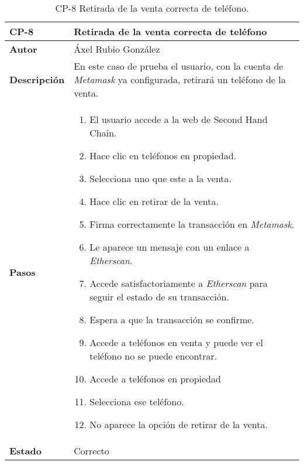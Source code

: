 \begin{table}[p]
	\centering
	\begin{tabularx}{\linewidth}{ p{} p{} }
		\toprule
		\textbf{CP-8}    & \textbf{Retirada de la venta correcta de teléfono}\\
		\toprule
		\textbf{Autor}                & Áxel Rubio González \\
		\textbf{Descripción}          & En este caso de prueba el usuario, con la cuenta de \textit{Metamask} ya configurada, retirará un teléfono de la venta. \\
		\textbf{Pasos}             &
		\begin{enumerate}
			\def\labelenumi{\arabic{enumi}.}
			\tightlist
			\item El usuario accede a la web de Second Hand Chain.
                \item Hace clic en teléfonos en propiedad.
                \item Selecciona uno que este a la venta.
                \item Hace clic en retirar de la venta.
                \item Firma correctamente la transacción en \textit{Metamask}.
                \item Le aparece un mensaje con un enlace a \textit{Etherscan}.
                \item Accede satisfactoriamente a \textit{Etherscan} para seguir el estado de su transacción.
                \item Espera a que la transacción se confirme.
                \item Accede a teléfonos en venta y puede ver el teléfono no se puede encontrar.
                \item Accede a teléfonos en propiedad
                \item Selecciona ese teléfono.
                \item No aparece la opción de retirar de la venta.
		\end{enumerate}\\
		\textbf{Estado}          & Correcto \\
		\bottomrule
	\end{tabularx}
	\caption{CP-8 Retirada de la venta correcta de teléfono.}
\end{table}

